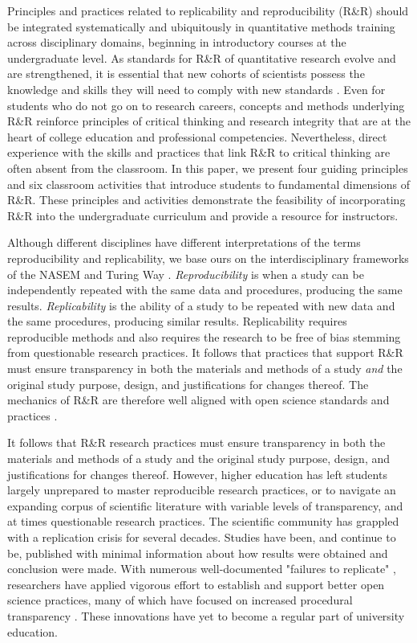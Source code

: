 \documentclass[
  12pt]{article}
\begin{document}
Principles and practices related to replicability and reproducibility (R\&R) should be integrated systematically and ubiquitously in quantitative methods training across disciplinary domains, beginning in introductory courses at the undergraduate level.
As standards for R\&R of quantitative research evolve and are strengthened, it is essential that new cohorts of scientists possess the knowledge and skills they will need to comply with new standards \citep{nasem2019}.
Even for students who do not go on to research careers, concepts and methods underlying R\&R reinforce principles of critical thinking and research integrity that are at the heart of college education and professional competencies.
Nevertheless, direct experience with the skills and practices that link R\&R to critical thinking are often absent from the classroom.
In this paper, we present four guiding principles and six classroom activities that introduce students to fundamental dimensions of R\&R.
These principles and activities demonstrate the feasibility of incorporating R\&R into the undergraduate curriculum and provide a resource for instructors. 

Although different disciplines have different interpretations of the terms reproducibility and replicability, we base ours on the interdisciplinary frameworks of the NASEM \citeyearpar{nasem2019} and Turing Way \citeyearpar{TheTuringWay}.
\emph{Reproducibility} is when a study can be independently repeated with the same data and procedures, producing the same results.
\emph{Replicability} is the ability of a study to be repeated with new data and the same procedures, producing similar results.
Replicability requires reproducible methods and also requires the research to be free of bias stemming from questionable research practices.
It follows that practices that support R\&R must ensure transparency in both the materials and methods of a study \textit{and} the original study purpose, design, and justifications for changes thereof.
The mechanics of R\&R are therefore well aligned with open science standards and practices \citep{nosek_promoting_2015}.

It follows that R\&R research practices must ensure transparency in both the materials and methods of a study and the original study purpose, design, and justifications for changes thereof.
However, higher education has left students largely unprepared to master reproducible research practices, or to navigate an expanding corpus of scientific literature with variable levels of transparency, and at times questionable research practices.
The scientific community has grappled with a replication crisis for several decades. Studies have been, and continue to be, published with minimal information about how results were obtained and conclusion were made. 
With numerous well-documented "failures to replicate" \citep{doyen2012behavioral, mobley2013survey, levelt2012flawed}, researchers have applied vigorous effort to establish and support better open science practices, many of which have focused on increased procedural transparency \citep{sandve2013ten, christensen2019transparent}. 
These innovations have yet to become a regular part of university education.
\end{document}
